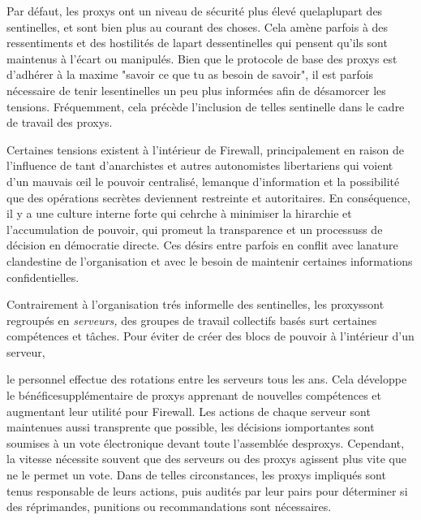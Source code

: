 Par défaut, les proxys ont un niveau de sécurité plus élevé quelaplupart des sentinelles, et sont bien plus au courant des choses. Cela amène parfois à des ressentiments et des hostilités de lapart dessentinelles qui pensent qu'ils sont maintenus à l'écart ou manipulés. Bien que le protocole de base des proxys est d'adhérer à la maxime "savoir ce que tu as besoin de savoir", il est parfois nécessaire de tenir lesentinelles un peu plus informées afin de désamorcer les tensions. Fréquemment, cela précède l'inclusion de telles sentinelle dans le cadre de travail des proxys. 

Certaines tensions existent à l'intérieur de Firewall, principalement en raison de l'influence de tant d'anarchistes et autres autonomistes libertariens qui voient d'un mauvais œil le pouvoir centralisé, lemanque d'information et la possibilité que des opérations secrètes deviennent restreinte et autoritaires. En conséquence, il y a une culture interne forte qui cehrche à minimiser la hirarchie et l'accumulation de pouvoir, qui promeut la transparence et un processuss de décision en démocratie directe. Ces désirs entre parfois en conflit avec lanature clandestine de l'organisation et avec le besoin de maintenir certaines informations confidentielles. 

Contrairement à l'organisation trés informelle des sentinelles, les proxyssont regroupés en \textit{serveurs,} des groupes de travail collectifs basés surt certaines compétences et tâches. Pour éviter de créer des blocs de pouvoir à l'intérieur d'un serveur, 

le personnel effectue des rotations entre les serveurs tous les ans. Cela développe le bénéficesupplémentaire de proxys apprenant de nouvelles compétences et augmentant leur utilité pour Firewall. Les actions de chaque serveur sont maintenues aussi transprente que possible, les décisions iomportantes sont soumises à un vote électronique devant toute l'assemblée desproxys. Cependant, la vitesse nécessite souvent que des serveurs ou des proxys agissent plus vite que ne le permet un vote. Dans de telles circonstances, les proxys impliqués sont tenus responsable de leurs actions, puis audités par leur pairs pour déterminer si des réprimandes, punitions ou recommandations sont nécessaires. 

